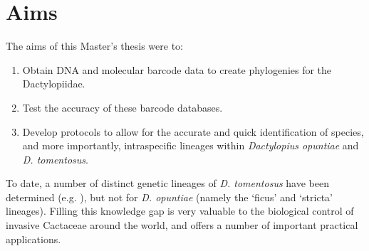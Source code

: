 \section{Aims}

The aims of this Master's thesis were to: 
\vspace{0.4cm}

\begin{enumerate}
    \item Obtain DNA and molecular barcode data to create phylogenies for the Dactylopiidae.
    \item Test the accuracy of these barcode databases.
    \item Develop protocols to allow for the accurate and quick identification of species, and more importantly, intraspecific lineages within \textit{Dactylopius opuntiae} and \textit{D. tomentosus}.
\end{enumerate}
\vspace{0.4cm}

\noindent To date, a number of distinct genetic lineages of \textit{D. tomentosus} have been determined (e.g. \citet{Mathenge2009, Mathenge2010}), but not for \textit{D. opuntiae} (namely the `ficus' and `stricta' lineages). Filling this knowledge gap is very valuable to the biological control of invasive Cactaceae around the world, and offers a number of important  practical applications. 
